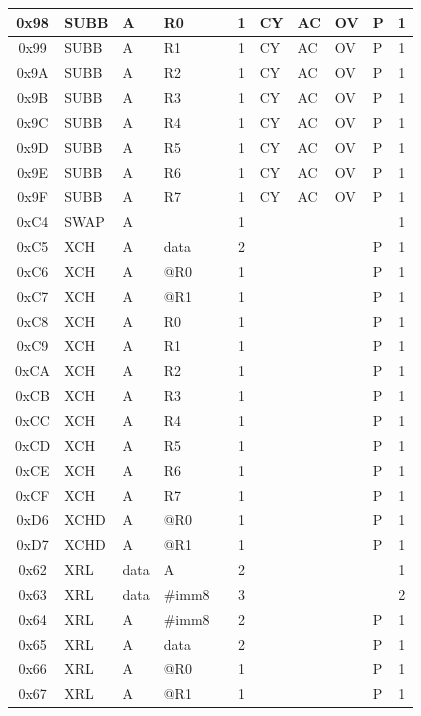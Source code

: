 \documentclass[a4paper,twoside,12pt]{book}
\begin{document}
{\begin{longtable}{|c|l|lll|c|llll|c|}
		0x98	& SUBB	& A	& R0	&	& 1	& CY	& AC	& OV	& P	& 1	\\\hline
		0x99	& SUBB	& A	& R1	&	& 1	& CY	& AC	& OV	& P	& 1	\\\hline
		0x9A	& SUBB	& A	& R2	&	& 1	& CY	& AC	& OV	& P	& 1	\\\hline
		0x9B	& SUBB	& A	& R3	&	& 1	& CY	& AC	& OV	& P	& 1	\\\hline
		0x9C	& SUBB	& A	& R4	&	& 1	& CY	& AC	& OV	& P	& 1	\\\hline
		0x9D	& SUBB	& A	& R5	&	& 1	& CY	& AC	& OV	& P	& 1	\\\hline
		0x9E	& SUBB	& A	& R6	&	& 1	& CY	& AC	& OV	& P	& 1	\\\hline
		0x9F	& SUBB	& A	& R7	&	& 1	& CY	& AC	& OV	& P	& 1	\\\hline
		0xC4	& SWAP	& A	&	&	& 1	&	&	&	&	& 1	\\\hline
		0xC5	& XCH	& A	& data	&	& 2	&	&	&	& P	& 1	\\\hline
		0xC6	& XCH	& A	& @R0	&	& 1	&	&	&	& P	& 1	\\\hline
		0xC7	& XCH	& A	& @R1	&	& 1	&	&	&	& P	& 1	\\\hline
		0xC8	& XCH	& A	& R0	&	& 1	&	&	&	& P	& 1	\\\hline
		0xC9	& XCH	& A	& R1	&	& 1	&	&	&	& P	& 1	\\\hline
		0xCA	& XCH	& A	& R2	&	& 1	&	&	&	& P	& 1	\\\hline
		0xCB	& XCH	& A	& R3	&	& 1	&	&	&	& P	& 1	\\\hline
		0xCC	& XCH	& A	& R4	&	& 1	&	&	&	& P	& 1	\\\hline
		0xCD	& XCH	& A	& R5	&	& 1	&	&	&	& P	& 1	\\\hline
		0xCE	& XCH	& A	& R6	&	& 1	&	&	&	& P	& 1	\\\hline
		0xCF	& XCH	& A	& R7	&	& 1	&	&	&	& P	& 1	\\\hline
		0xD6	& XCHD	& A	& @R0	&	& 1	&	&	&	& P	& 1	\\\hline
		0xD7	& XCHD	& A	& @R1	&	& 1	&	&	&	& P	& 1	\\\hline
		0x62	& XRL	& data	& A	&	& 2	&	&	&	&	& 1	\\\hline
		0x63	& XRL	& data	& \#imm8&	& 3	&	&	&	&	& 2	\\\hline
		0x64	& XRL	& A	& \#imm8&	& 2	&	&	&	& P	& 1	\\\hline
		0x65	& XRL	& A	& data	&	& 2	&	&	&	& P	& 1	\\\hline
		0x66	& XRL	& A	& @R0	&	& 1	&	&	&	& P	& 1	\\\hline
		0x67	& XRL	& A	& @R1	&	& 1	&	&	&	& P	& 1	\\\hline

\end{longtable}}
\end{document}
